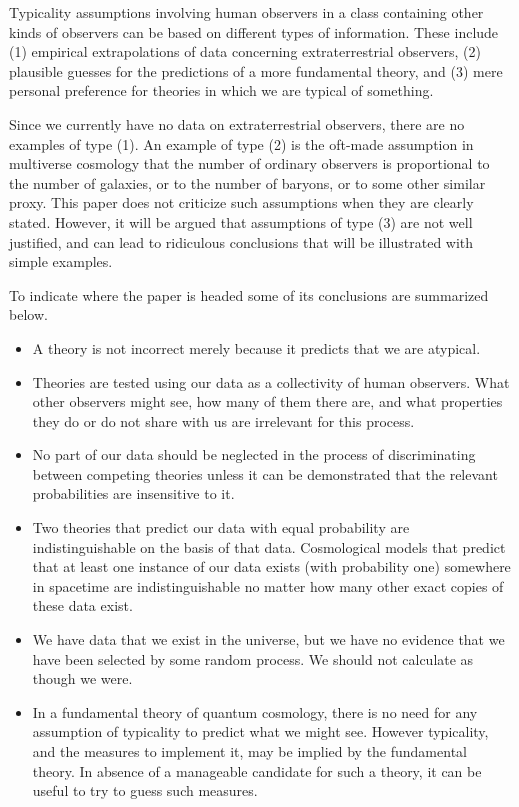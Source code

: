 \documentclass[pra,twocolumn,nofootinbib,eqsecnum,floatfix]{revtex4}
\begin{document}
Typicality assumptions involving human observers in a class containing other kinds of observers can be based on different types of information.  These include
(1) empirical extrapolations of data concerning extraterrestrial observers, 
(2) plausible guesses for the predictions of a more fundamental theory, and 
(3) mere personal preference for theories in which we are typical of something. 

Since we currently have no data on extraterrestrial observers, 
there are no examples of type (1). 
An example of type (2) is the oft-made assumption in multiverse cosmology  that the number of ordinary observers is proportional to the number of galaxies, or to the number of baryons, or to some other similar proxy.  This paper does not criticize such assumptions when they are clearly stated. However, it will be argued that assumptions of type (3) are not well justified, and can lead
to ridiculous conclusions that will be illustrated with simple examples. 

To indicate where the paper
is headed some of its conclusions are summarized below.

\begin{itemize}

\item A theory is not incorrect merely because it predicts that we are atypical.

\item Theories are tested using our data as a collectivity of human observers. What other observers might see, how many of them there are, and what properties they do or do not share with us are irrelevant for this process. 

\item No part of our data should be neglected in the process of discriminating between competing theories unless it can be demonstrated that the relevant probabilities are insensitive to it. 

\item Two theories that predict our data with equal probability are indistinguishable on the basis of that data. Cosmological models that predict that at least one instance of our data exists (with probability one) somewhere in spacetime are indistinguishable no matter how many other exact copies of these data exist. 

\item We have data that we exist in the universe, but we have no evidence that we have been selected by some random process. We should not calculate as though we were.  

\item In a fundamental theory of quantum cosmology, there is no need for  any assumption of typicality to predict what we might see. However typicality, and the measures to implement it, may be implied by the fundamental theory. In absence of a manageable candidate for such a theory, it can be useful to try to guess such measures. 

\end{itemize}
\end{document}
